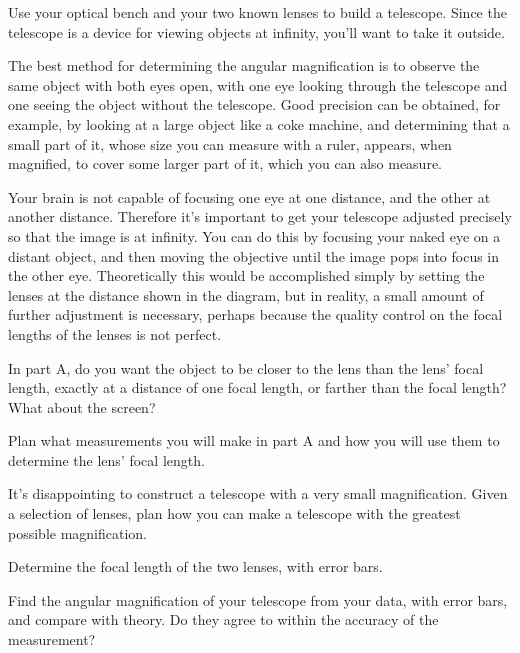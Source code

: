 
Use your optical bench and your two known lenses to build a
telescope.
 Since the telescope is a device for viewing objects
at infinity, you'll want to take it outside.

The best method for determining the angular magnification
is to observe the same object with both eyes open, with one
eye looking through the telescope and one seeing the object
without the telescope. Good precision can be obtained, for
example, by looking at a large object like a coke machine,
and determining that a small part of it, whose size you
can measure with a ruler, appears, when magnified, to cover some larger part
of it, which you can also measure. 

Your brain is not capable of focusing one eye at one distance, and
the other at another distance. Therefore it's important to get your
telescope adjusted precisely so that the image is at infinity.
You can do this by focusing your naked eye on a distant object, and
then moving the objective until the image pops into focus in the
other eye. Theoretically this would be accomplished simply by setting
the lenses at the distance shown in the diagram, but in reality,
a small amount of further adjustment is necessary, perhaps because
the quality control on the focal lengths of the lenses is not perfect.


\prelab

\lasersafety

\prelabquestion  In part A, do you want the object to be closer to the
lens than the lens' focal length, exactly at a distance of
one focal length, or farther than the focal length?
What about the screen?

\prelabquestion  Plan what measurements you will make in part A and how
you will use them to determine the lens' focal length.

\prelabquestion
It's disappointing to construct a telescope with
a very small magnification. Given a selection of lenses, plan
how you can make a telescope with the greatest possible
magnification.

\analysis

Determine the focal length of the two lenses, with error bars.

Find the angular magnification of your telescope from your
data, with error bars, and compare with theory. Do they
agree to within the accuracy of the measurement?
